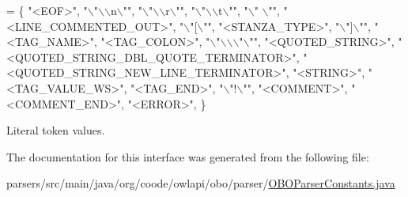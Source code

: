 \begin{DoxyCode}
= \{
    \textcolor{stringliteral}{"<EOF>"},
    \textcolor{stringliteral}{"\(\backslash\)"\(\backslash\)\(\backslash\)n\(\backslash\)""},
    \textcolor{stringliteral}{"\(\backslash\)"\(\backslash\)\(\backslash\)r\(\backslash\)""},
    \textcolor{stringliteral}{"\(\backslash\)"\(\backslash\)\(\backslash\)t\(\backslash\)""},
    \textcolor{stringliteral}{"\(\backslash\)" \(\backslash\)""},
    \textcolor{stringliteral}{"<LINE\_COMMENTED\_OUT>"},
    \textcolor{stringliteral}{"\(\backslash\)"[\(\backslash\)""},
    \textcolor{stringliteral}{"<STANZA\_TYPE>"},
    \textcolor{stringliteral}{"\(\backslash\)"]\(\backslash\)""},
    \textcolor{stringliteral}{"<TAG\_NAME>"},
    \textcolor{stringliteral}{"<TAG\_COLON>"},
    \textcolor{stringliteral}{"\(\backslash\)"\(\backslash\)\(\backslash\)\(\backslash\)"\(\backslash\)""},
    \textcolor{stringliteral}{"<QUOTED\_STRING>"},
    \textcolor{stringliteral}{"<QUOTED\_STRING\_DBL\_QUOTE\_TERMINATOR>"},
    \textcolor{stringliteral}{"<QUOTED\_STRING\_NEW\_LINE\_TERMINATOR>"},
    \textcolor{stringliteral}{"<STRING>"},
    \textcolor{stringliteral}{"<TAG\_VALUE\_WS>"},
    \textcolor{stringliteral}{"<TAG\_END>"},
    \textcolor{stringliteral}{"\(\backslash\)"!\(\backslash\)""},
    \textcolor{stringliteral}{"<COMMENT>"},
    \textcolor{stringliteral}{"<COMMENT\_END>"},
    \textcolor{stringliteral}{"<ERROR>"},
  \}
\end{DoxyCode}
Literal token values. 

The documentation for this interface was generated from the following file\-:\begin{DoxyCompactItemize}
\item 
parsers/src/main/java/org/coode/owlapi/obo/parser/\hyperlink{_o_b_o_parser_constants_8java}{O\-B\-O\-Parser\-Constants.\-java}\end{DoxyCompactItemize}
